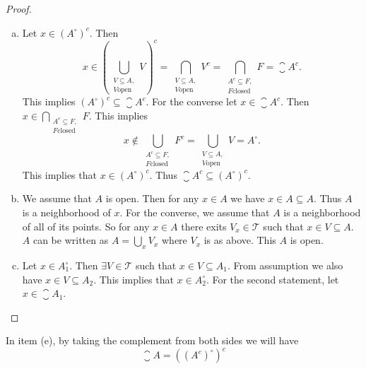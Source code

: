 \begin{proof}
\begin{enumerate}[(a)]
		\item Let $ x \in (A^\circ)^c $. Then 
		\[ x \in (\bigcup_{\substack{V \subseteq A,\\ V\text{open}}} V)^c = \bigcap_{\substack{V \subseteq A,\\ V\text{open}}} V^c = \bigcap_{\substack{A^c \subseteq F,\\ F\text{closed}}} F = \closure{A^c}. \]
		This implies $ (A^\circ)^c \subseteq \closure{A^c} $. For the converse let $ x \in \closure{A^c} $. Then $ x \in \bigcap_{\substack{A^c \subseteq F,\\ F\text{closed}}} F $. This implies
		\[ x \notin \bigcup_{\substack{A^c \subseteq F,\\ F\text{closed}}} F^c = \bigcup_{\substack{V\subseteq A,\\ V\text{open}}} V = A^\circ . \]
		This implies that $ x \in (A^\circ)^c $. Thus $ \closure{A^c} \subseteq (A^\circ)^c $.
		
		\item We assume that $ A $ is open. Then for any $ x \in A $ we have $ x \in A \subseteq A $. Thus $ A $ is a neighborhood of $ x $. For the converse, we assume that $ A $ is a neighborhood of all of its points. So for any $ x \in A $ there exits $ V_x \in \mathcal{T} $ such that $ x \in V \subseteq A $. $ A $ can be written as $ A = \bigcup_x V_x $ where $ V_x $ is as above. This $ A $ is open.
		
		\item Let $ x \in A_1^\circ $. Then $ \exists V \in \mathcal{T} $ such that $ x \in V \subseteq A_1 $. From assumption we also have $ x \in V \subseteq A_2 $. This implies that $ x \in A_2^\circ $. For the second statement, let $ x \in \closure{A_1} $.
	\end{enumerate}
\end{proof}
\begin{remark}
	In item (e), by taking the complement from both sides we will have
	\[ \closure{A} = ((A^c)^\circ)^c \]
\end{remark}











